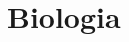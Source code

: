 \documentclass[../main]{subfiles}
\begin{document}
\part{Biologia}
\label{part:biologia}
\end{document}
